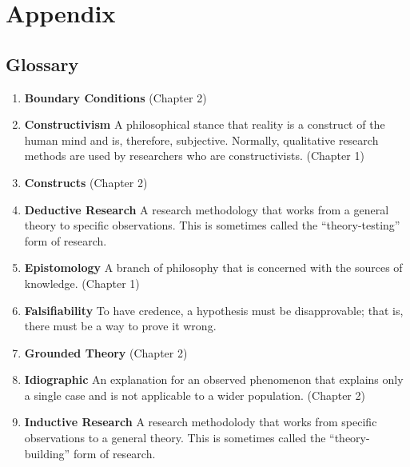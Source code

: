 \chapter{Appendix}

\section*{Glossary}

\begin{enumerate}
	
	\item \textbf{Boundary Conditions} (Chapter 2)
	
	\item \textbf{Constructivism} A philosophical stance that reality is a construct of the human mind and is, therefore, subjective. Normally, qualitative research methods are used by researchers who are constructivists. (Chapter 1)
	
	\item \textbf{Constructs} (Chapter 2)
	
	\item \textbf{Deductive Research} A research methodology that works from a general theory to specific observations. This is sometimes called the ``theory-testing'' form of research.
	
	\item \textbf{Epistomology} A branch of philosophy that is concerned with the sources of knowledge. (Chapter 1)
	
	\item \textbf{Falsifiability} To have credence, a hypothesis must be disapprovable; that is, there must be a way to prove it wrong.
	
	\item \textbf{Grounded Theory} (Chapter 2)
	
	\item \textbf{Idiographic} An explanation for an observed phenomenon that explains only a single case and is not applicable to a wider population. (Chapter 2)
	
	\item \textbf{Inductive Research} A research methodolody that works from specific observations to a general theory. This is sometimes called the ``theory-building'' form of research.
	

\end{enumerate}
